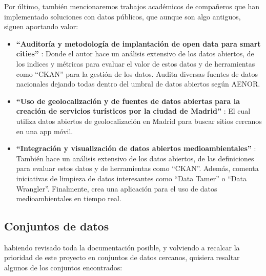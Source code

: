 	Por último, también mencionaremos trabajos académicos de compañeros que han implementado soluciones con datos públicos, que aunque son algo antiguos, siguen aportando valor:
	
	\begin{itemize}
			\item \textbf{``Auditoría y metodología de implantación de open data para smart cities''} \citep{MelendrezMoreto2016Auditoria}: Donde el autor hace un análisis extensivo de los datos abiertos, de los indices y métricas para evaluar el valor de estos datos y de herramientas como ``CKAN'' para la gestión de los datos. Audita diversas fuentes de datos nacionales dejando todas dentro del umbral de datos abiertos según AENOR. 
			
			\item \textbf{``Uso de geolocalización y de fuentes de datos abiertas para la creación de servicios turísticos por la ciudad de Madrid''} \citep{LLamoccaPortela2016Integracion}: El cual utiliza datos abiertos de geolocalización en Madrid para buscar sitios cercanos en una app móvil.
			
			\item \textbf{``Integración y visualización de datos abiertos medioambientales''} \citep{ArellanoBruno2019UsoDeGeolocalizacion}: También hace un análisis extensivo de los datos abiertos, de las definiciones para evaluar estos datos y de herramientas como ``CKAN''. Además, comenta iniciativas de limpieza de datos interesantes como ``Data Tamer'' o ``Data Wrangler''. Finalmente, crea una aplicación para el uso de datos medioambientales en tiempo real. \\
	\end{itemize} 
	
	\subsection{Conjuntos de datos}
	
	habiendo revisado toda la documentación posible, y volviendo a recalcar la prioridad de este proyecto en conjuntos de datos cercanos, quisiera resaltar algunos de los conjuntos encontrados:
	
